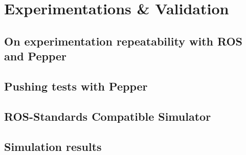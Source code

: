 
\chapter{Experimentations \& Validation} %

\label{Chapter5} %

\section{On experimentation repeatability with ROS and Pepper}


\section{Pushing tests with Pepper}


\section{ROS-Standards Compatible Simulator}

\section{Simulation results}

%
